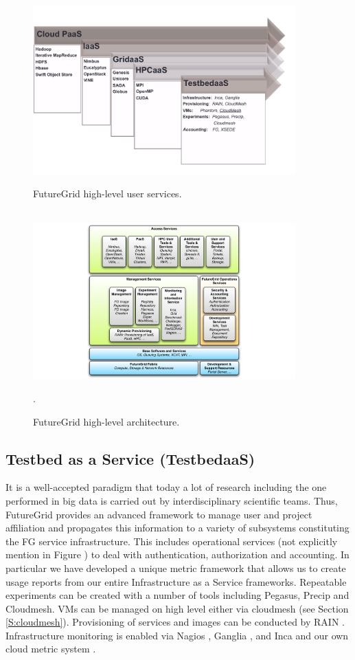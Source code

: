 \documentclass{article}
\begin{document}
\begin{figure}[p]
  \centering
    \includegraphics[width=0.9\textwidth]{images/user-services.pdf}
  \caption{FutureGrid high-level user services.}\label{F:services}
  ~\\
  \centering
  \includegraphics[width=0.9\textwidth]{images/architecture.pdf}
  \caption{FutureGrid high-level architecture.}\label{F:arch}.
\end{figure}

\subsection{Testbed as a Service (TestbedaaS)}

It is a well-accepted paradigm that today a lot of research including the one performed in big data is carried out by interdisciplinary scientific teams. Thus, FutureGrid provides an advanced framework to manage user and project affiliation and propagates this information to a variety of subsystems constituting the FG service infrastructure. This includes operational services (not explicitly mention in Figure \label{F:services}) to deal with authentication, authorization and accounting. In particular we have developed a unique metric framework that allows us to create usage reports from our entire Infrastructure as a Service frameworks. Repeatable experiments can be created with a number of tools including Pegasus, Precip and Cloudmesh. VMs can be managed on high level either via cloudmesh (see Section \ref{S:cloudmesh}). Provisioning of services and images can be conducted by RAIN \cite{imagemanagement,fg-1295}. Infrastructure monitoring is enabled via Nagios \cite{nagios}, Ganglia \cite{ganglia}, and Inca \cite{inca} and our own cloud metric system \cite{las08federated-cloud}.
\end{document}
